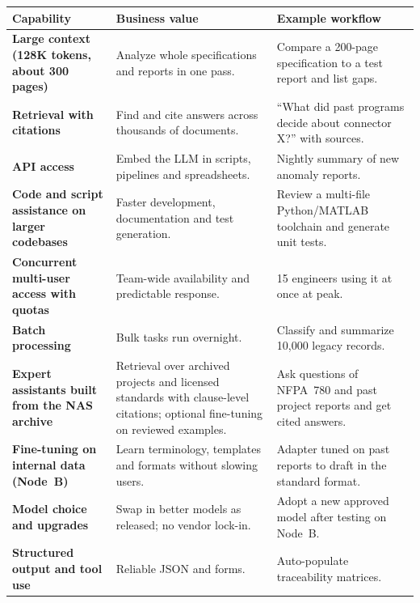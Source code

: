 

{\footnotesize
\begin{xltabular}{\textwidth}{@{}Y{0.844}Y{0.938}Y{1.218}@{}}
  \toprule
  Capability & Business value & Example workflow \\
  \midrule
  \endhead
  \textbf{Large context (128K tokens, about 300 pages)} & Analyze whole specifications and reports in one pass. & Compare a 200-page specification to a test report and list gaps. \\
  \textbf{Retrieval with citations} & Find and cite answers across thousands of documents. & ``What did past programs decide about connector X?'' with sources. \\
  \textbf{API access} & Embed the LLM in scripts, pipelines and spreadsheets. & Nightly summary of new anomaly reports. \\
  \textbf{Code and script assistance on larger codebases} & Faster development, documentation and test generation. & Review a multi-file Python/MATLAB toolchain and generate unit tests. \\
  \textbf{Concurrent multi-user access with quotas} & Team-wide availability and predictable response. & 15 engineers using it at once at peak. \\
  \textbf{Batch processing} & Bulk tasks run overnight. & Classify and summarize 10,000 legacy records. \\
  \textbf{Expert assistants built from the NAS archive} & Retrieval over archived projects and licensed standards with clause-level citations; optional fine-tuning on reviewed examples. & Ask questions of NFPA~780 and past project reports and get cited answers. \\
  \textbf{Fine-tuning on internal data (Node~B)} & Learn terminology, templates and formats without slowing users. & Adapter tuned on past reports to draft in the standard format. \\
  \textbf{Model choice and upgrades} & Swap in better models as released; no vendor lock-in. & Adopt a new approved model after testing on Node~B. \\
  \textbf{Structured output and tool use} & Reliable JSON and forms. & Auto-populate traceability matrices. \\
  \bottomrule
\end{xltabular}}

